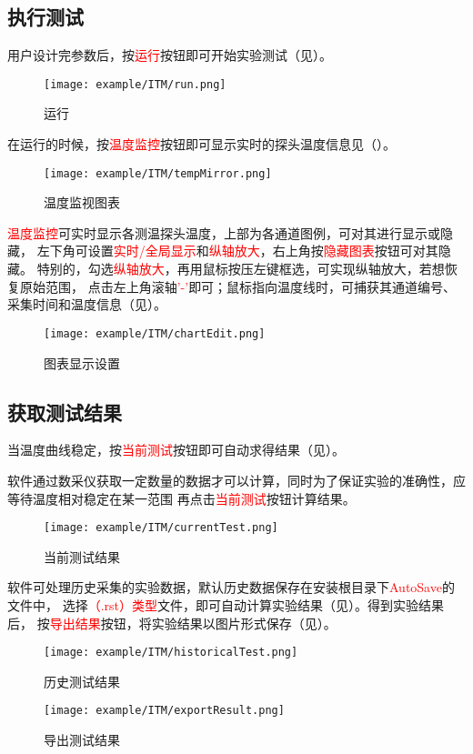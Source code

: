 \subsection{执行测试}
用户设计完参数后，按\textcolor{red}{运行}按钮即可开始实验测试（见）。
\begin{figure}[H]
	\centering
	\texttt{[image: example/ITM/run.png]}
	\caption{ 运行 \label{fig:exmp_itm_run}}
\end{figure}
在运行的时候，按\textcolor{red}{温度监控}按钮即可显示实时的探头温度信息见（）。
\begin{figure}[H]
	\centering
	\texttt{[image: example/ITM/tempMirror.png]}
	\caption{ 温度监视图表 \label{fig:exmp_itm_tempMirror}}
\end{figure}
\textcolor{red}{温度监控}可实时显示各测温探头温度，上部为各通道图例，可对其进行显示或隐藏，
左下角可设置\textcolor{red}{实时/全局显示}和\textcolor{red}{纵轴放大}，右上角按\textcolor{red}{隐藏图表}按钮可对其隐藏。
特别的，勾选\textcolor{red}{纵轴放大}，再用鼠标按压左键框选，可实现纵轴放大，若想恢复原始范围，
点击左上角滚轴\textcolor{red}{'-'}即可；鼠标指向温度线时，可捕获其通道编号、采集时间和温度信息（见）。\\
\begin{figure}[H]
	\centering
	\texttt{[image: example/ITM/chartEdit.png]}
	\caption{ 图表显示设置 \label{fig:exmp_itm_chartEdit}}
\end{figure}

\subsection{获取测试结果}
	当温度曲线稳定，按\textcolor{red}{当前测试}按钮即可自动求得结果（见）。
\begin{note}
	软件通过数采仪获取一定数量的数据才可以计算，同时为了保证实验的准确性，应等待温度相对稳定在某一范围
再点击\textcolor{red}{当前测试}按钮计算结果。
\end{note}
\begin{figure}[H]
	\centering
	\texttt{[image: example/ITM/currentTest.png]}
	\caption{ 当前测试结果 \label{fig:exmp_itm_currentTest}}
\end{figure}
软件可处理历史采集的实验数据，默认历史数据保存在安装根目录下\textcolor{red}{AutoSave}的文件中，
选择\textcolor{red}{（.rst）类型}文件，即可自动计算实验结果（见）。得到实验结果后，
按\textcolor{red}{导出结果}按钮，将实验结果以图片形式保存（见）。
\begin{figure}[H]
	\centering
	\texttt{[image: example/ITM/historicalTest.png]}
	\caption{ 历史测试结果 \label{fig:exmp_itm_historicalTest}}
\end{figure}

\begin{figure}[H]
	\centering
	\texttt{[image: example/ITM/exportResult.png]}
	\caption{ 导出测试结果 \label{fig:exmp_itm_exportResult}}
\end{figure}